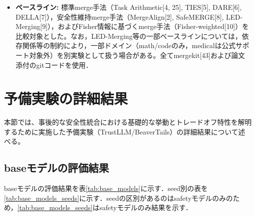 \documentclass{article}
\begin{document}
\begin{itemize}
    \begin{itemize}
        \item merge種類:
        \texttt{safety+math},
        \texttt{safety+code},
        \texttt{safety+medical}の2model merge，および多重ドメインmerge\texttt{safety+code+math+medical}。
        \item 比較条件（Pareto優先）:
        安全性評価と有用性評価のPareto Frontier上で支配されない最適・典型設定（$\alpha=0.6$等）および軌跡全体の二通りで比較。ハイパーパラメータ調整を伴わないベースライン（SafeMERGE, MergeAlign等）は既定設定（$\alpha=\mathrm{N/A}$）で評価。
    \end{itemize}
    \item \textbf{ベースライン:}
    標準merge手法（Task Arithmetic[4, 25], TIES[5], DARE[6], DELLA[7]），安全性維持merge手法（MergeAlign[2], SafeMERGE[8], LED-Merging[9]），およびFisher情報に基づくmerge手法（Fisher-weighted[10]）を比較対象とした。なお，LED-Merging等の一部ベースラインについては，依存関係等の制約により，一部ドメイン（math/codeのみ，medicalは公式サポート対象外）を別実験として扱う場合がある。全てmergekit[43]および論文添付のgitコードを使用．
\end{itemize}


\section{予備実験の詳細結果}
\label{app:preliminary_results}
本節では、事後的な安全性統合における基礎的な挙動とトレードオフ特性を解明するために実施した予備実験（TrustLLM/BeaverTails）の詳細結果について述べる。

\subsection{baseモデルの評価結果}

baseモデルの評価結果を表\ref{tab:base_models}に示す．seed別の表を\ref{tab:base_models_seeds}に示す．seedの区別があるのはsafetyモデルのみのため，\ref{tab:base_models_seeds}はsafetyモデルのみ結果を示す．
\end{document}

